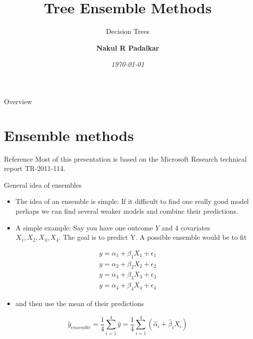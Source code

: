 \documentclass[11pt,aspectratio=1610,usenames,dvipsnames]{beamer} %
\title{Tree Ensemble Methods}
\subtitle{Decision Trees}
\author[Nakul R Padalkar] %
{\bfseries Nakul R Padalkar} %
\institute[Georgetown University]{\MakeUppercase{Georgetown University}} %
\date{\it\today}
\begin{document}
\begin{frame}[plain]
\maketitle
\end{frame}

\begin{frame}{Overview}

\begin{multicols}{2}
	\tableofcontents[]
\end{multicols}

\end{frame}


\section{Ensemble methods}
\begin{frame}{Reference}
	Most of this presentation is based on the Microsoft Research technical report TR-2011-114.
\end{frame}

\begin{frame}{General idea of ensembles}
\begin{itemize}
	\item 	The idea of an ensemble is simple: If it difficult to find one really good model perhaps we can find several weaker models and combine their predictions.
	\item A simple example: Say you have one outcome $Y$ and 4 covariates $ X_1, X_2, X_3, X_4 $. The goal is to predict Y. A possible ensemble would be to fit
\end{itemize}
	\begin{align*}
		y=\alpha_1 + \beta_1 X_1 + \epsilon_1\\
		y=\alpha_2 + \beta_2 X_2 + \epsilon_2\\
		y=\alpha_3 + \beta_3 X_3 + \epsilon_3\\
		y=\alpha_4 + \beta_4 X_4 + \epsilon_4
	\end{align*}%
\begin{itemize}
	\item 	and then use the mean of their predictions
\end{itemize}
	\begin{equation}
		\hat{y}_{ensemble}=\frac{1}{4}\sum_{i=1}^{4} \hat{y}=\frac{1}{4}\sum_{i=1}^{4}(\hat{\alpha}_i + \hat{\beta}_iX_i)
	\end{equation}
	
\end{frame}
\end{document}
